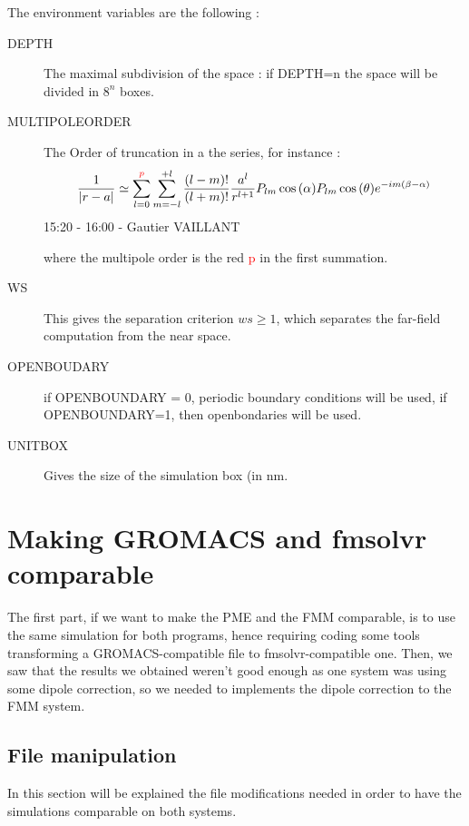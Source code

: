 \documentclass[10pt,twoside,a4paper]{report}
\begin{document}
The environment variables are the following :

\begin{description}
\item[DEPTH] The maximal subdivision of the space : if DEPTH=n the space will be divided in $8^{n}$ boxes.

\item[MULTIPOLEORDER] The Order of truncation in a the series, for instance :
\begin{equation*}
	\frac{1}{|r - a|} \simeq \sum\limits_{l=0}^{\textcolor{red}{p}} \sum\limits_{m = -l}^{+l} \frac{(l-m)!}{(l+m)!} \frac{a^l}{r^{l+1}} P_{lm}\cos{(\alpha)}P_{lm}\cos{(\theta)}e^{-im(\beta - \alpha)}
	\end{equation*}15:20 - 16:00 - Gautier VAILLANT
	
	where the multipole order is the red \textcolor{red}{p} in the first summation.
	
	
\item[WS] This gives the separation criterion $ws \geq 1$, which separates the far-field computation from the near space.

\item[OPENBOUDARY] if OPENBOUNDARY = 0, periodic boundary conditions will be used, if OPENBOUNDARY=1, then openbondaries will be used.

\item[UNITBOX] Gives the size of the simulation box (in nm.

\end{description}
 	
\section{Making GROMACS and fmsolvr comparable}	

The first part, if we want to make the PME and the FMM comparable, is to use the same simulation for both programs, hence requiring coding some tools transforming a GROMACS-compatible file to fmsolvr-compatible one. Then, we saw that the results we obtained weren't good enough as one system was using some dipole correction, so we needed to implements the dipole correction to the FMM system.

\subsection{File manipulation}

In this section will be explained the file modifications needed in order to have the simulations comparable on both systems.
\end{document}
